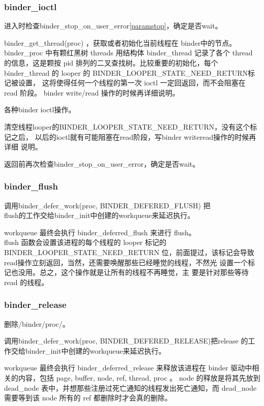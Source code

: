 \documentclass[a4paper,11pt]{article}
\begin{document}
\subsubsection{binder_ioctl}
\begin{itemize*}
    \item 进入时检查binder_stop_on_user_error{\tiny\autoref{paramstop}}，确定是否wait。
    \item  binder_get_thread(proc) ，获取或者初始化当前线程在 binder中的节点。
        binder_proc 中有颗红黑树 threads 用结构体 binder_thread 记录了各个
        thread 的信息，这是颗按 pid 排列的二叉查找树。比较重要的初始化，每个
        binder_thread 的 looper 的 BINDER_LOOPER_STATE_NEED_RETURN标记被设置，
        这将使得任何一个线程的第一次 ioctl 一定回返回，而不会阻塞在 read 阶段。
        binder write/read 操作的时候再详细说明。
    \item 各种binder ioctl操作。
    \item 清空线程looper的BINDER_LOOPER_STATE_NEED_RETURN，没有这个标记之后，
        以后的ioctl就有可能阻塞在read阶段，写binder writeread操作的时候再详细
        说明。
    \item 返回前再次检查binder_stop_on_user_error，确定是否wait。
\end{itemize*}

\subsubsection{binder_flush}
\begin{itemize*}
    \item 调用binder_defer_work(proc, BINDER_DEFERED_FLUSH)
        把\\flush的工作交给binder_init中创建的workqueue来延迟执行。
    \item workqueue 最终会执行 binder_deferred_flush 来进行 flush。
        \\flush 函数会设置该进程的每个线程的 looper 标记的
        BINDER_LOOPER_STATE_NEED_RETURN 位，前面提过，该标记会导致
        \\read操作立刻返回，当然，还需要唤醒那些已经睡觉的线程，不然光
        设置一个标记也没用。总之，这个操作就是让所有的线程不再睡觉，主
        要是针对那些等待 read 的线程。
\end{itemize*}

\subsubsection{binder_release}
\begin{itemize*}
    \item 删除/binder/proc/。
    \item 调用binder_defer_work(proc, BINDER_DEFERED_RELEASE)把release
        的工作交给binder_init中创建的workqueue来延迟执行。
    \item  workqueue 最终会执行 binder_deferred_release 来释放该进程在
        binder 驱动中相关的内容，包括 page, buffer, node, ref, thread,
        proc 。 node 的释放是将其先放到 dead_node
        表中，并想那些注册过死亡通知的线程发出死亡通知，而 dead_node
        需要等到该 node 所有的 ref 都删除时才会真的删除。
\end{itemize*}
\end{document}
